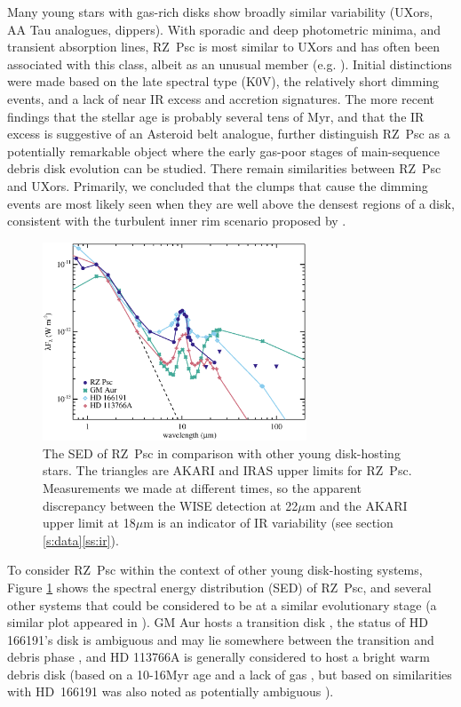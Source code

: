 \documentclass[]{rsos}
\begin{document}
Many young stars with gas-rich disks show broadly similar variability (UXors, AA Tau
analogues, dippers). With sporadic and deep photometric minima, and transient absorption
lines, RZ~Psc is most similar to UXors and has often been associated with this class,
albeit as an unusual member (e.g. \cite{2010A&A...524A...8G}). Initial distinctions
were made based on the late spectral type (K0V), the relatively short dimming events, and
a lack of near IR excess and accretion signatures. The more recent findings that the
stellar age is probably several tens of Myr, and that the IR excess is suggestive of an
Asteroid belt analogue, further distinguish RZ~Psc as a potentially remarkable object
where the early gas-poor stages of main-sequence debris disk evolution can be
studied. There remain similarities between RZ~Psc and UXors. Primarily, we concluded that
the clumps that cause the dimming events are most likely seen when they are well above
the densest regions of a disk, consistent with the turbulent inner rim scenario proposed
by \cite{2003ApJ...594L..47D}.

\begin{figure}
  \begin{center}
    \hspace{-0.5cm} \includegraphics[width=0.7\textwidth]{figs/spcomp.eps}
    \caption{The SED of RZ~Psc in comparison with other young disk-hosting stars. The
      triangles are AKARI and IRAS upper limits for RZ~Psc. Measurements we made at
      different times, so the apparent discrepancy between the WISE detection at 22$\mu$m
      and the AKARI upper limit at 18$\mu$m is an indicator of IR variability (see
      section \ref{s:data}\ref{ss:ir}).}\label{fig:spcomp}
  \end{center}
\end{figure}

To consider RZ~Psc within the context of other young disk-hosting systems, Figure
\ref{fig:spcomp} shows the spectral energy distribution (SED) of RZ~Psc, and several
other systems that could be considered to be at a similar evolutionary stage (a similar
plot appeared in \cite{2014MNRAS.438.3299K}). GM Aur hosts a transition disk
\cite{2005ApJ...630L.185C}, the status of HD 166191's disk is ambiguous and may lie
somewhere between the transition and debris phase
\cite{2013ApJ...777...78S,2014MNRAS.438.3299K}, and HD 113766A is generally considered to
host a bright warm debris disk (based on a 10-16Myr age and a lack of gas
\cite{2006ApJS..166..351C}, but based on similarities with HD~166191 was also noted as
potentially ambiguous \cite{2014MNRAS.438.3299K}).
\end{document}
